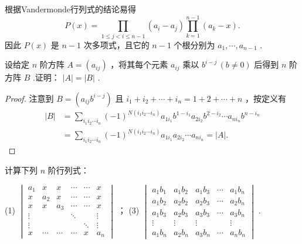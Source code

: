 \begin{sol}
	根据Vandermonde行列式的结论易得
	\[
		P(x)=\prod_{1\le j<i\le n-1}(a_i-a_j)\prod_{k=1}^{n-1}(a_k-x).
	\]
	因此 $P(x)$ 是 $n-1$ 次多项式，且它的 $n-1$ 个根分别为 $a_1,\cdots,a_{n-1}$ .
\end{sol}
\begin{prob}[25]
	设给定 $n$ 阶方阵 $A=(a_{ij})$ ，将其每个元素 $a_{ij}$ 乘以 $b^{i-j}\,(b\ne0)$ 后得到 $n$ 阶方阵 $B$ .证明： $|A|=|B|$ .
\end{prob}
\begin{proof}
	注意到 $B=(a_{ij}b^{i-j})$ 且 $i_1+i_2+\cdots+i_n=1+2+\cdots+n$ ，按定义有
	\begin{align*}
		|B| & =\sum_{i_1i_2\cdots i_n}(-1)^{N(i_1i_2\cdots i_n)}a_{1i_1}b^{1-i_1}a_{2i_2}b^{2-i_2}\cdots a_{ni_n}b^{n-i_n} \\
		    & =\sum_{i_1i_2\cdots i_n}(-1)^{N(i_1i_2\cdots i_n)}a_{1i_1}a_{2i_2}\cdots a_{ni_n}=|A|.
	\end{align*}
\end{proof}
\begin{prob}[26-A]
	计算下列 $n$ 阶行列式：

	(1) $\begin{vmatrix}
			a_1    & x      & x      & \cdots & \cdots & x      \\
			x      & a_2    & x      & \cdots & \cdots & x      \\
			x      & x      & a_3    & \cdots & \cdots & x      \\
			\vdots &        &        & \ddots &        & \vdots \\
			\vdots &        &        &        & \ddots & \vdots \\
			x      & \cdots & \cdots & \cdots & x      & a_n
		\end{vmatrix}$ ；\qquad\qquad
	(3) $\begin{vmatrix}
			a_1b_1 & a_1b_2 & a_1b_3 & \cdots & a_1b_n \\
			a_1b_2 & a_2b_2 & a_2b_3 & \cdots & a_2b_n \\
			a_1b_3 & a_2b_3 & a_3b_3 & \cdots & a_3b_n \\
			\vdots & \vdots & \vdots &        & \vdots \\
			a_1b_n & a_2b_n & a_3b_n & \cdots & a_nb_n
		\end{vmatrix}$ .
\end{prob}
